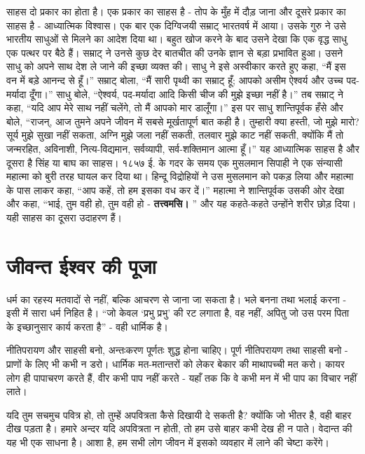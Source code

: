 साहस दो प्रकार का होता है। एक प्रकार का साहस है - तोप के मुँह में दौड़ जाना और दूसरे प्रकार का साहस है - आध्यात्मिक विश्वास। एक बार एक दिग्विजयी सम्राट् भारतवर्ष में आया। उसके गुरु ने उसे भारतीय साधुओं से मिलने का आदेश दिया था। बहुत खोज करने के बाद उसने देखा कि एक वृद्ध साधु एक पत्थर पर बैठे हैं। सम्राट् ने उनसे कुछ देर बातचीत की उनके ज्ञान से बड़ा प्रभावित हुआ। उसने साधु को अपने साथ देश ले जाने की इच्छा व्यक्त की। साधु ने इसे अस्वीकार करते हुए कहा, “मैं इस वन में बड़े आनन्द से हूँ।” सम्राट् बोला, “मैं सारी पृथ्वी का सम्राट् हूँ; आपको असीम ऐश्वर्य और उच्च पद-मर्यादा दूँगा।” साधु बोले, “ऐश्वर्य, पद-मर्यादा आदि किसी चीज की मुझे इच्छा नहीं है।” तब सम्राट् ने कहा, “यदि आप मेरे साथ नहीं चलेंगे, तो मैं आपको मार डालूँगा।” इस पर साधु शान्तिपूर्वक हँसे और बोले, “राजन्, आज तुमने अपने जीवन में सबसे मूर्खतापूर्ण बात कही है। तुम्हारी क्या हस्ती, जो मुझे मारो? सूर्य मुझे सुखा नहीं सकता, अग्नि मुझे जला नहीं सकती, तलवार मुझे काट नहीं सकती, क्योंकि मैं तो जन्मरहित, अविनाशी, नित्य-विद्यमान, सर्वव्यापी, सर्व-शक्तिमान आत्मा हूँ।” यह आध्यात्मिक साहस है और दूसरा है सिंह या बाघ का साहस। १८५७ ई. के गदर के समय एक मुसलमान सिपाही ने एक संन्यासी महात्मा को बुरी तरह घायल कर दिया था। हिन्दू विद्रोहियों ने उस मुसलमान को पकड़ लिया और महात्मा के पास लाकर कहा, “आप कहें, तो हम इसका वध कर दें।” महात्मा ने शान्तिपूर्वक उसकी ओर देखा और कहा, “भाई, तुम वही हो, तुम वही हो - \textbf{तत्त्वमसि। }” और यह कहते-कहते उन्होंने शरीर छोड़ दिया। यही साहस का दूसरा उदाहरण हैं।


\section*{जीवन्त ईश्वर की पूजा}


धर्म का रहस्य मतवादों से नहीं, बल्कि आचरण से जाना जा सकता है। भले बनना तथा भलाई करना - इसी में सारा धर्म निहित है। “जो केवल ‘प्रभु प्रभु’ की रट लगाता है, वह नहीं, अपितु जो उस परम पिता के इच्छानुसार कार्य करता है” - वही धार्मिक है। 

नीतिपरायण और साहसी बनो, अन्तःकरण पूर्णतः शुद्ध होना चाहिए। पूर्ण नीतिपरायण तथा साहसी बनो - प्राणों के लिए भी कभी न डरो। धार्मिक मत-मतान्तरों को लेकर बेकार की माथापच्ची मत करो। कायर लोग ही पापाचरण करते हैं, वीर कभी पाप नहीं करते - यहाँ तक कि वे कभी मन में भी पाप का विचार नहीं लाते। 

यदि तुम सचमुच पवित्र हो, तो तुम्हें अपवित्रता कैसे दिखायी दे सकती है? क्योंकि जो भीतर है, वही बाहर दीख पड़ता है। हमारे अन्दर यदि अपवित्रता न होती, तो हम उसे बाहर कभी देख ही न पाते। वेदान्त की यह भी एक साधना है। आशा है, हम सभी लोग जीवन में इसको व्यवहार में लाने की चेष्टा करेंगे। 

